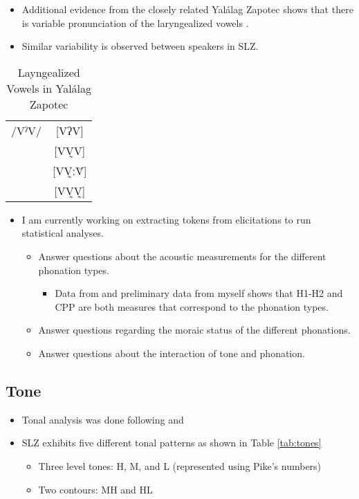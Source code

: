 \documentclass[12pt, letterpaper]{article}
\providecommand{\lsptoprule}{\midrule\toprule}
\providecommand{\lspbottomrule}{\bottomrule\midrule}
\begin{document}
\begin{itemize}
	\item Additional evidence from the closely related Yalálag Zapotec shows that there is variable pronunciation of the laryngealized vowels \citep{avelinobecerraTopicsYalalagZapotec2004,avelinoAcousticElectroglottographicAnalyses2010}. 
	\item Similar variability is observed between speakers in SLZ. 
\end{itemize}

\begin{table}[!h]
\centering
\caption{Layngealized Vowels in Yalálag Zapotec}
\label{tab:larngeal}
 \begin{tabular}{lc}
  \lsptoprule
	/VˀV/ &  [VʔV]  \\
	    	&  [VV̰V]   \\
	   		&  [VV̰ːV̆]  \\
	   		&  [VV̰V̰]	\\
  \lspbottomrule
 \end{tabular}
\end{table}

\begin{itemize}
	\item I am currently working on extracting tokens from elicitations to run statistical analyses.  
		\begin{itemize}
			\item Answer questions about the acoustic measurements for the different phonation types. 
				\begin{itemize}
					\item Data from \citet{adlerAcousticsPhonationTypes2016} and preliminary data from myself shows that H1-H2 and CPP are both measures that correspond to the phonation types. 
				\end{itemize}
			\item Answer questions regarding the moraic status of the different phonations.
			\item Answer questions about the interaction of tone and phonation.  
		\end{itemize}
\end{itemize}


\subsection{Tone} \label{sec:Tone}

\begin{itemize}
	\item Tonal analysis was done following \citet{pikeToneLanguagesTechnique1948} and \citet{sniderToneAnalysisField2018}

	\item SLZ exhibits five different tonal patterns as shown in Table \ref{tab:tones}
		\begin{itemize}
			\item Three level tones: H, M, and L (represented using Pike's numbers)
			\item Two contours: MH and HL
		\end{itemize}
\end{itemize}
\end{document}
